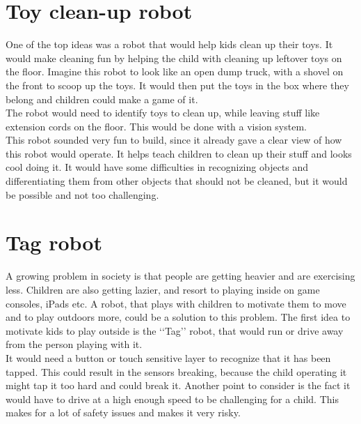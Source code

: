 \documentclass[11pt,twoside,a4paper]{report}
\begin{document}
\section{Toy clean-up robot}
One of the top ideas was a robot that would help kids clean up their toys. It would make cleaning fun by helping the child with cleaning up leftover toys on the floor. Imagine this robot to look like an open dump truck, with a shovel on the front to scoop up the toys. It would then put the toys in the box where they belong and children could make a game of it. \\
The robot would need to identify toys to clean up, while leaving stuff like extension cords on the floor. This would be done with a vision system. \\
This robot sounded very fun to build, since it already gave a clear view of how this robot would operate. It helps teach children to clean up their stuff and looks cool doing it. It would have some difficulties in recognizing objects and differentiating them from other objects that should not be cleaned, but it would be possible and not too challenging.

\section{Tag robot}
A growing problem in society is that people are getting heavier and are exercising less. Children are also getting lazier, and resort to playing inside on game consoles, iPads etc. A robot, that plays with children to motivate them to move and to play outdoors more, could be a solution to this problem. The first idea to motivate kids to play outside is the \lq\lq{}Tag\rq\rq{} robot, that would run or drive away from the person playing with it. \\
It would need a button or touch sensitive layer to recognize that it has been tapped. This could result in the sensors breaking, because the child operating it might tap it too hard and could break it. Another point to consider is the fact it would have to drive at a high enough speed to be challenging for a child. This makes for a lot of safety issues and makes it very risky. 
\end{document}
